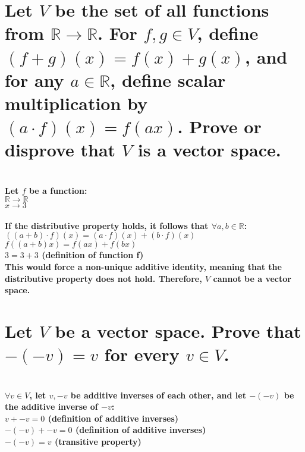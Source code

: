 \documentclass{article}
\begin{document}
\newpage

\section{Let \(V\) be the set of all functions from \(\mathds{R} \rightarrow \mathds{R}\). For \(f, g \in V\), define \((f + g)(x) = f(x) + g(x)\), and for any \(a \in \mathds{R}\), define scalar multiplication by \((a \cdot f)(x) = f(ax)\). Prove or disprove that \(V\) is a vector space.}

\paragraph{\large
\\Let \(f\) be a function:
\\\indent \(\mathds{R} \rightarrow \mathds{R}\)
\\\indent \(x \rightarrow 3\)}

\paragraph{\large
If the distributive property holds, it follows that \(\forall a, b \in \mathds{R}\):
\\\indent \(((a + b) \cdot f)(x) = (a \cdot f)(x) + (b \cdot f)(x)\)
\\\indent \(f((a+b)x) = f(ax) + f(bx)\)
\\\indent \(3 = 3 + 3\) (definition of function f)
\\This would force a non-unique additive identity, meaning that the distributive property does not hold. Therefore, \(V\) cannot be a vector space.}

\newpage

\section{Let \(V\) be a vector space. Prove that \(-(-v) = v\)  for every \(v \in V\).}

\paragraph{\large
\\\(\forall v \in V\), let \(v, -v\) be additive inverses of each other, and let \(-(-v)\) be the additive inverse of \(-v\):
\\\indent \(v + -v = 0\) (definition of additive inverses)
\\\indent \(-(-v) + -v = 0\) (definition of additive inverses)
\\\indent \(-(-v) = v\) (transitive property)}
\end{document}
